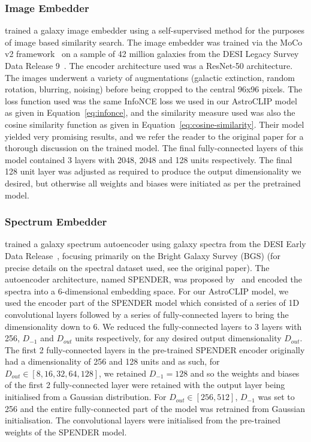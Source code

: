 \subsubsection{Image Embedder}\label{subsubsec:image-embedder}
\cite{stein2021} trained a galaxy image embedder using a self-supervised method for the purposes of image based similarity search.
The image embedder was trained via the MoCo v2 framework~\citep{moco2020, mocov22020} on a sample of 42 million galaxies
from the DESI Legacy Survey Data Release 9~\citep{desilegacy2018}.
The encoder architecture used was a ResNet-50 architecture.
The images underwent a variety of augmentations (galactic extinction, random rotation, blurring, noising) before
being cropped to the central 96x96 pixels.
The loss function used was the same InfoNCE loss we used in our AstroCLIP model as given in Equation~\eqref{eq:infonce},
and the similarity measure used was also the cosine similarity function as given in Equation~\eqref{eq:cosine-similarity}.
Their model yielded very promising results, and we refer the reader to the original paper for a thorough discussion
on the trained model.
The final fully-connected layers of this model contained 3 layers with 2048, 2048 and 128 units respectively.
The final 128 unit layer was adjusted as required to produce the output dimensionality we desired, but otherwise all
weights and biases were initiated as per the pretrained model.

\subsubsection{Spectrum Embedder}\label{subsubsec:spectrum-embedder}
\cite{liang2023} trained a galaxy spectrum autoencoder using galaxy spectra from the DESI Early Data Release~\citep{desiearly2023},
focusing primarily on the Bright Galaxy Survey (BGS) (for precise details on the spectral dataset used, see the original paper).
The autoencoder architecture, named SPENDER, was proposed by~\cite{melchior2022} and encoded the spectra into a 6-dimensional
embedding space.
For our AstroCLIP model, we used the encoder part of the SPENDER model which consisted of a series of 1D convolutional layers
followed by a series of fully-connected layers to bring the dimensionality down to 6.
We reduced the fully-connected layers to 3 layers with 256, $D_{-1}$ and $D_{out}$ units respectively, for any desired
output dimensionality $D_{out}$.
The first 2 fully-connected layers in the pre-trained SPENDER encoder originally had a dimensionality of 256 and 128 units
and as such, for $D_{out} \in [8, 16, 32, 64, 128]$, we retained $D_{-1}=128$ and so the weights and biases of the
first 2 fully-connected layer were retained with the output layer being initialised from a Gaussian distribution.
For $D_{out} \in [256, 512]$, $D_{-1}$ was set to 256 and the entire fully-connected part of the model was retrained
from Gaussian initialisation.
The convolutional layers were initialised from the pre-trained weights of the SPENDER model.







